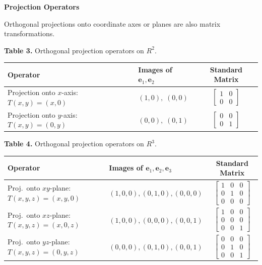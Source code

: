 \documentclass{article}
\newcommand{\redheading}[1]{{\vspace{2mm}\noindent\Large\bfseries\color{red!55!black} #1\par}\vspace{2mm}}
\theoremstyle{mystyle}
\begin{document}
\redheading{Projection Operators}

Orthogonal projections onto coordinate axes or planes are also matrix transformations.

\vspace{3mm}
\noindent\textbf{Table 3.} Orthogonal projection operators on $R^2$.
\renewcommand{\arraystretch}{1.5}
\begin{center}
\begin{tabular}{|l|l|c|}
\hline
\textbf{Operator} & \textbf{Images of $\mathbf{e}_1,\mathbf{e}_2$} & \textbf{Standard Matrix} \\
\hline
Projection onto $x$-axis: $T(x,y)=(x,0)$ & $(1,0),\;(0,0)$ & $\begin{bmatrix}1&0\\0&0\end{bmatrix}$ \\
\hline
Projection onto $y$-axis: $T(x,y)=(0,y)$ & $(0,0),\;(0,1)$ & $\begin{bmatrix}0&0\\0&1\end{bmatrix}$ \\
\hline
\end{tabular}
\end{center}

\vspace{3mm}
\noindent\textbf{Table 4.} Orthogonal projection operators on $R^3$.
\begin{center}
\begin{tabular}{|l|l|c|}
\hline
\textbf{Operator} & \textbf{Images of $\mathbf{e}_1,\mathbf{e}_2,\mathbf{e}_3$} & \textbf{Standard Matrix} \\
\hline
Proj.\ onto $xy$-plane: $T(x,y,z)=(x,y,0)$ & $(1,0,0),(0,1,0),(0,0,0)$ & $\begin{bmatrix}1&0&0\\0&1&0\\0&0&0\end{bmatrix}$ \\
\hline
Proj.\ onto $xz$-plane: $T(x,y,z)=(x,0,z)$ & $(1,0,0),(0,0,0),(0,0,1)$ & $\begin{bmatrix}1&0&0\\0&0&0\\0&0&1\end{bmatrix}$ \\
\hline
Proj.\ onto $yz$-plane: $T(x,y,z)=(0,y,z)$ & $(0,0,0),(0,1,0),(0,0,1)$ & $\begin{bmatrix}0&0&0\\0&1&0\\0&0&1\end{bmatrix}$ \\
\hline
\end{tabular}
\end{center}
\renewcommand{\arraystretch}{1}
\end{document}
